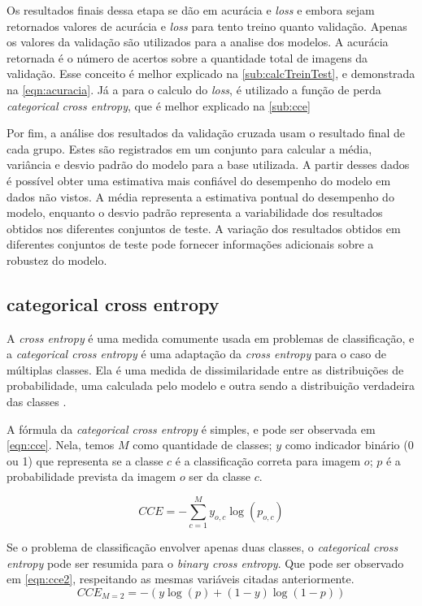 Os resultados finais dessa etapa se dão em acurácia e \textit{loss} e embora sejam retornados valores de acurácia e \textit{loss} para tento treino quanto validação.
Apenas os valores da validação são utilizados para a analise dos modelos.
A acurácia retornada é o número de acertos sobre a quantidade total de imagens da validação.
Esse conceito é melhor explicado na \autoref{sub:calcTreinTest}, e demonstrada na \autoref{eqn:acuracia}.
Já a para o calculo do \textit{loss}, é utilizado a função de perda \textit{categorical cross entropy}, que é melhor explicado na \autoref{sub:cce}

Por fim, a análise dos resultados da validação cruzada usam o resultado final de cada grupo.
Estes são registrados em um conjunto para calcular a média, variância e desvio padrão do modelo para a base utilizada.
A partir desses dados é possível obter uma estimativa mais confiável do desempenho do modelo em dados não vistos. 
A média representa a estimativa pontual do desempenho do modelo, enquanto o desvio padrão representa a variabilidade dos resultados obtidos nos diferentes conjuntos de teste.
A variação dos resultados obtidos em diferentes conjuntos de teste pode fornecer informações adicionais sobre a robustez do modelo.


\subsection{categorical cross entropy}
\label{sub:cce}
A \textit{cross entropy} é uma medida comumente usada em problemas de classificação, e a \textit{categorical cross entropy} é uma adaptação da \textit{cross entropy} para o caso de múltiplas classes. 
Ela é uma medida de dissimilaridade entre as distribuições de probabilidade, uma calculada pelo modelo e outra sendo a distribuição verdadeira das classes \cite{geeron2017handson}.

A fórmula da \textit{categorical cross entropy} é simples, e pode ser observada em \autoref{eqn:cce}.
Nela, temos $M$ como quantidade de classes; 
$y$ como indicador binário (0 ou 1) que representa se a classe $c$ é a classificação correta para imagem $o$; 
$p$ é a probabilidade prevista da imagem $o$ ser da classe $c$.


\begin{equation}
\label{eqn:cce}
CCE = -\sum_{c=1}^My_{o,c}\log(p_{o,c})
\end{equation}

Se o problema de classificação envolver apenas duas classes, o \textit{categorical cross entropy} pode ser resumida para o \textit{\textit{binary cross entropy}}.
Que pode ser observado em \autoref{eqn:cce2}, respeitando as mesmas variáveis citadas anteriormente.
\begin{equation}
\label{eqn:cce2}
CCE_{M=2} = -{(y\log(p) + (1 - y)\log(1 - p))}
\end{equation}


